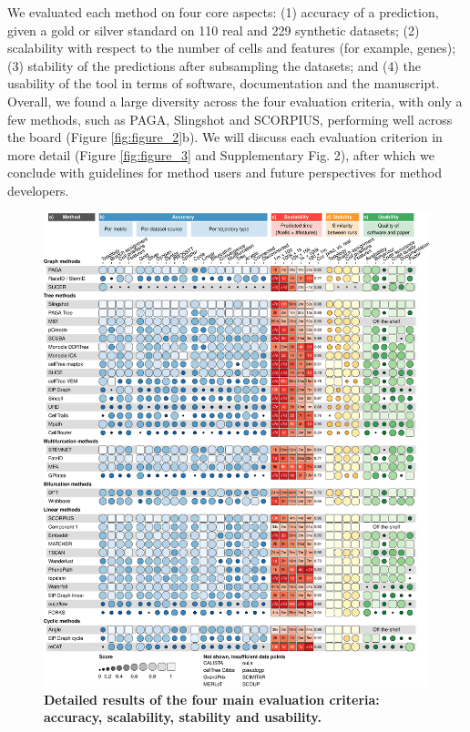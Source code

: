 We evaluated each method on four core aspects: (1) accuracy of a prediction, given a gold or silver standard on 110 real and 229 synthetic datasets; (2) scalability with respect to the number of cells and features (for example, genes); (3) stability of the predictions after subsampling the datasets; and (4) the usability of the tool in terms of software, documentation and the manuscript. Overall, we found a large diversity across the four evaluation criteria, with only a few methods, such as PAGA, Slingshot and SCORPIUS, performing well across the board (Figure \ref{fig:figure_2}b). We will discuss each evaluation criterion in more detail (Figure \ref{fig:figure_3} and Supplementary Fig. 2), after which we conclude with guidelines for method users and future perspectives for method developers.

\begin{figure}[htb!]
	\centering\includegraphics[width=\linewidth]{fig/figure_3.pdf}
	\caption{	
		\textbf{Detailed results of the four main evaluation criteria: accuracy, scalability, stability and usability.}
}
\end{figure}
